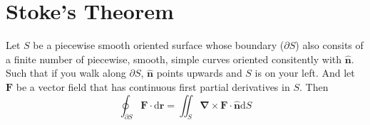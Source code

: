 \section{Stoke's Theorem}
\begin{definition}		
Let $S$ be a piecewise smooth oriented surface whose boundary ($\partial S$) also consits of a finite number of piecewise, smooth, simple curves oriented consitently with $\hat{\mathbf{n} }$.	Such that if you walk along $\partial S$, $\hat{\mathbf{n}}$ points upwards and $S$ is on your left. And let $\mathbf{F} $ be a vector field that has continuous first partial derivatives in $S$. Then
\[
	\oint_{\partial S} \mathbf{F} \cdot \mathrm{d}\mathbf{r} = \iint_S \bm{\nabla} \times \mathbf{F} \cdot \hat{\mathbf{n} }\mathrm{d}S
\] 


\end{definition}

